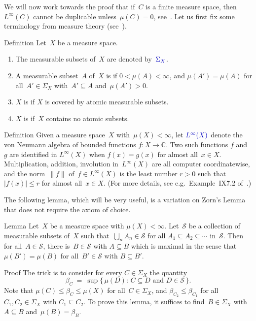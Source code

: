 \documentclass[a]{subfiles}
\begin{document}
\begin{parsec}%
\begin{point}%
We will now work towards
the proof that
if~$C$ is a finite measure space,
then
$L^\infty(C)$
cannot be duplicable 
unless~$\mu(C)=0$,
see~.
Let us first fix some terminology
from measure theory (see~\cite{fremlin}).
\end{point}
\begin{point}{Definition}
\label{def:measure-space}
Let~$X$ be a measure space.
\begin{enumerate}
\item
The measurable subsets of~$X$
are denoted by~$\Define{\Sigma_X}$.
\item
A measurable subset~$A$ of~$X$
is 
if $0<\mu(A)<\infty$,
and $\mu(A')=\mu(A)$ for all~$A'\in\Sigma_X$
with~$A'\subseteq A$ and~$\mu(A')>0$.

\item
$X$ is  if $X$ is covered by atomic measurable subsets.

\item
$X$ is 
if~$X$ contains no atomic subsets.
\end{enumerate}
\end{point}
\begin{point}{Definition}%
Given a measure space~$X$
with~$\mu(X)<\infty$, 
let
$\Define{L^\infty(X)}$
denote the von Neumann algebra
of bounded functions $f\colon X\to\mathbb{C}$.
Two such functions $f$ and~$g$ are identified in $L^\infty(X)$
when $f(x)=g(x)$ for almost all~$x\in X$.
Multiplication, addition, involution in~$L^\infty(X)$
are all computer coordinatewise,
and the norm~$\|f\|$ of~$f\in L^\infty(X)$
is the least number $r>0$ such that $|f(x)|\leq r$
for almost all~$x\in X$.
(For more details,
see e.g.~Example~IX7.2 of~\cite{conway2007}.)
\end{point}

The following lemma,
which will be very useful,
is a variation on
Zorn's Lemma
that does not require the axiom of choice.
\begin{point}{Lemma}
Let~$X$ be a measure space with $\mu(X)<\infty$.
Let~$\mathcal{S}$
be a collection of measurable subsets of~$X$
such that~$\bigcup_n A_n\in\mathcal{S}$
for all $A_1\subseteq A_2 \subseteq \dotsb$
in~$\mathcal{S}$.
Then for all~$A\in\mathcal{S}$,
there is~$B\in\mathcal{S}$
with $A\subseteq B$
which is maximal in the sense
that $\mu(B')=\mu(B)$
for all~$B'\in\mathcal{S}$ with $B\subseteq B'$.
\begin{point}{Proof}
The trick is to consider for every $C\in\Sigma_X$
the quantity
\begin{equation*}
	\beta_C \ = \ \sup\{\,\mu(D)\colon\, C\subseteq D
\text{ and }D\in \mathcal{S}\,\}.
\end{equation*}
Note that $\mu(C)\leq \beta_C \leq \mu(X)$
for all~$C\in\Sigma_X$,
	and $\beta_{C_2}\leq \beta_{C_1}$
	for all~$C_1,C_2\in\Sigma_X$ with $C_1 \subseteq C_2$.
To prove this lemma, it suffices to find~$B\in\Sigma_X$
with $A\subseteq B$ and~$\mu(B)=\beta_B$.


\end{point}
\end{point}
\end{parsec}
\end{document}

